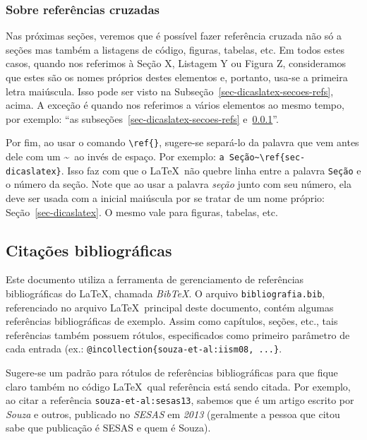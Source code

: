 \subsubsection{Sobre referências cruzadas}
\label{sec-dicaslatex-secoes-sobrerefs}

Nas próximas seções, veremos que é possível fazer referência cruzada não só a seções mas também a listagens de código, figuras, tabelas, etc. Em todos estes casos, quando nos referimos à Seção X, Listagem Y ou Figura Z, consideramos que estes são os nomes próprios destes elementos e, portanto, usa-se a primeira letra maiúscula. Isso pode ser visto na Subseção~\ref{sec-dicaslatex-secoes-refs}, acima. A exceção é quando nos referimos a vários elementos ao mesmo tempo, por exemplo: ``as subseções~\ref{sec-dicaslatex-secoes-refs} e~\ref{sec-dicaslatex-secoes-sobrerefs}''.

Por fim, ao usar o comando \texttt{\textbackslash ref\{\}}, sugere-se separá-lo da palavra que vem antes dele com um \textasciitilde\ ao invés de espaço. Por exemplo: \texttt{a Seção\textasciitilde \textbackslash ref\{sec-dicaslatex\}}. Isso faz com que o \LaTeX\ não quebre linha entre a palavra \texttt{Seção} e o número da seção. Note que ao usar a palavra \emph{seção} junto com seu número, ela deve ser usada com a inicial maiúscula por se tratar de um nome próprio: Seção~\ref{sec-dicaslatex}. O mesmo vale para figuras, tabelas, etc.




\subsection{Citações bibliográficas}
\label{sec-dicaslatex-citacoes}

Este documento utiliza a ferramenta de gerenciamento de referências bibliográficas do \LaTeX, chamada \emph{BibTeX}. O arquivo \texttt{bibliografia.bib}, referenciado no arquivo \LaTeX\ principal deste documento, contém algumas referências bibliográficas de exemplo. Assim como capítulos, seções, etc., tais referências também possuem rótulos, especificados como primeiro parâmetro de cada entrada (ex.: \texttt{@incollection\{souza-et-al:iism08, ...\}}.

Sugere-se um padrão para rótulos de referências bibliográficas para que fique claro também no código \LaTeX\ qual referência está sendo citada. Por exemplo, ao citar a referência \texttt{souza-et-al:sesas13}, sabemos que é um artigo escrito por \emph{Souza} e outros, publicado no \emph{SESAS} em \emph{2013} (geralmente a pessoa que citou sabe que publicação é SESAS e quem é Souza).

